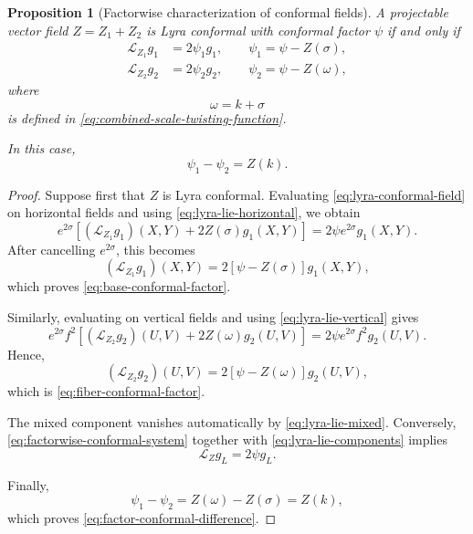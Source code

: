 \documentclass[a4paper,11pt]{article}
\theoremstyle{plain}
\newtheorem{proposition}{Proposition}[section]
\numberwithin{equation}{section}
\begin{document}
\begin{proposition}[Factorwise characterization of conformal fields]
	\label{prop:factorwise-conformal-characterization}
	A projectable vector field \(Z=Z_{1}+Z_{2}\) is Lyra conformal
	with conformal factor \(\psi\) if and only if
	\begin{subequations}
		\label{eq:factorwise-conformal-system}
		\begin{align}
			\mathcal L_{Z_{1}}g_{1}
			&=
			2\psi_{1}g_{1},
			\qquad
			\psi_{1}
			=
			\psi-Z(\sigma),
			\label{eq:base-conformal-factor}
			\\
			\mathcal L_{Z_{2}}g_{2}
			&=
			2\psi_{2}g_{2},
			\qquad
			\psi_{2}
			=
			\psi-Z(\omega),
			\label{eq:fiber-conformal-factor}
		\end{align}
	\end{subequations}
	where
	\[
	\omega=k+\sigma
	\]
	is defined in
	\eqref{eq:combined-scale-twisting-function}.
	
	In this case,
	\begin{equation}
		\psi_{1}-\psi_{2}
		=
		Z(k).
		\label{eq:factor-conformal-difference}
	\end{equation}
\end{proposition}

\begin{proof}
	Suppose first that \(Z\) is Lyra conformal. Evaluating
	\eqref{eq:lyra-conformal-field} on horizontal fields and using
	\eqref{eq:lyra-lie-horizontal}, we obtain
	\[
	e^{2\sigma}
	\left[
	(\mathcal L_{Z_{1}}g_{1})(X,Y)
	+
	2Z(\sigma)g_{1}(X,Y)
	\right]
	=
	2\psi e^{2\sigma}g_{1}(X,Y).
	\]
	After cancelling \(e^{2\sigma}\), this becomes
	\[
	(\mathcal L_{Z_{1}}g_{1})(X,Y)
	=
	2\left[
	\psi-Z(\sigma)
	\right]g_{1}(X,Y),
	\]
	which proves \eqref{eq:base-conformal-factor}.
	
	Similarly, evaluating on vertical fields and using
	\eqref{eq:lyra-lie-vertical} gives
	\[
	e^{2\sigma}f^{2}
	\left[
	(\mathcal L_{Z_{2}}g_{2})(U,V)
	+
	2Z(\omega)g_{2}(U,V)
	\right]
	=
	2\psi e^{2\sigma}f^{2}g_{2}(U,V).
	\]
	Hence,
	\[
	(\mathcal L_{Z_{2}}g_{2})(U,V)
	=
	2\left[
	\psi-Z(\omega)
	\right]g_{2}(U,V),
	\]
	which is \eqref{eq:fiber-conformal-factor}.
	
	The mixed component vanishes automatically by
	\eqref{eq:lyra-lie-mixed}. Conversely,
	\eqref{eq:factorwise-conformal-system} together with
	\eqref{eq:lyra-lie-components} implies
	\[
	\mathcal L_{Z}g_{L}=2\psi g_{L}.
	\]
	
	Finally,
	\[
	\psi_{1}-\psi_{2}
	=
	Z(\omega)-Z(\sigma)
	=
	Z(k),
	\]
	which proves \eqref{eq:factor-conformal-difference}.
\end{proof}
\end{document}

